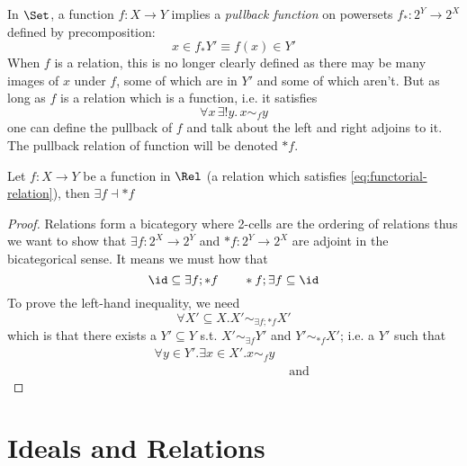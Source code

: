 \medskip
In $\Set$, a function $f : X \to Y$ implies a \emph{pullback
  function} on powersets $f_* : 2^Y \to 2^X$ defined by
precomposition:
%
\begin{equation}\label{eq:functorial-relation}
x \in f_* Y' \equiv f(x) \in Y'
\end{equation}
%
When $f$ is a relation, this is no longer clearly defined as there may
be many images of $x$ under $f$, some of which are in $Y'$ and some of
which aren't. But as long as $f$ is a relation which is a function,
i.e. it satisfies
\[ \forall x\,\exists! y.\, x \sim_f y \]
one can define the pullback of $f$ and talk about the left and right
adjoins to it. 
The pullback relation of function will be denoted $* f$. 
\begin{lemma}
  Let $f : X \to Y$ be a function in $\Rel$ (a relation which
  satisfies \eqref{eq:functorial-relation}), then $\exists f \dashv *f$ 
\end{lemma}
\begin{proof}
  Relations form a bicategory where 2-cells are the ordering of
  relations thus we want to show that $\exists f: 2^X \to 2^Y$ and
  $*f: 2^Y \to 2^X$ are adjoint in the bicategorical sense. It means
  we must how that 
\[
\id \subseteq \exists f ; * f\qquad *f ; \exists f \subseteq \id
\]
To prove the left-hand inequality, we need 
\[ 
\forall X' \subseteq X . X' \sim_{\exists f ; * f} X'
\]
which is that there exists a $Y' \subseteq Y$ s.t. $X' \sim_{\exists
  f} Y'$ and $Y' \sim_{* f} X'$; i.e. a $Y'$ such that
\begin{align*}
\forall y \in Y'. \exists x \in X'. x \sim_f y\\
&\text{ and }
\end{align*}
\end{proof}



\section{Ideals and Relations}



